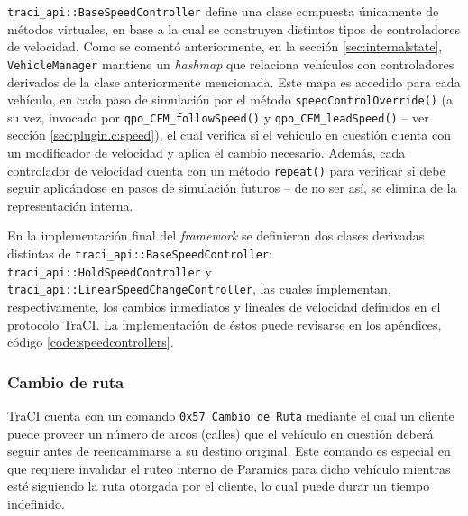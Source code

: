 \texttt{traci\_api::BaseSpeedController} define una clase compuesta únicamente de métodos virtuales, en base a la cual se construyen distintos tipos de controladores de velocidad. Como se comentó anteriormente, en la sección \ref{sec:internalstate}, \texttt{VehicleManager} mantiene un \emph{hashmap} que relaciona vehículos con controladores derivados de la clase anteriormente mencionada. Este mapa es accedido para cada vehículo, en cada paso de simulación por el método \texttt{speedControlOverride()} (a su vez, invocado por \texttt{qpo\_CFM\_followSpeed()} y \texttt{qpo\_CFM\_leadSpeed()} -- ver sección \ref{sec:plugin.c:speed}), el cual verifica si el vehículo en cuestión cuenta con un modificador de velocidad y aplica el cambio necesario. Además, cada controlador de velocidad cuenta con un método \texttt{repeat()} para verificar si debe seguir aplicándose en pasos de simulación futuros -- de no ser así, se elimina de la representación interna.



En la implementación final del \emph{framework} se definieron dos clases derivadas distintas de \texttt{traci\_api::BaseSpeedController}: \texttt{traci\_api::HoldSpeedController} y \texttt{traci\_api::LinearSpeedChangeController}, las cuales implementan, respectivamente, los cambios inmediatos y lineales de velocidad definidos en el protocolo TraCI. La implementación de éstos puede revisarse en los apéndices, código \ref{code:speedcontrollers}.

\subsubsection{Cambio de ruta}\label{sec:routeoverride}

TraCI cuenta con un comando \texttt{0x57 Cambio de Ruta} mediante el cual un cliente puede proveer un número de arcos (calles) que el vehículo en cuestión deberá seguir antes de reencaminarse a su destino original. Este comando es especial en que requiere invalidar el ruteo interno de Paramics para dicho vehículo mientras esté siguiendo la ruta otorgada por el cliente, lo cual puede durar un tiempo indefinido.

